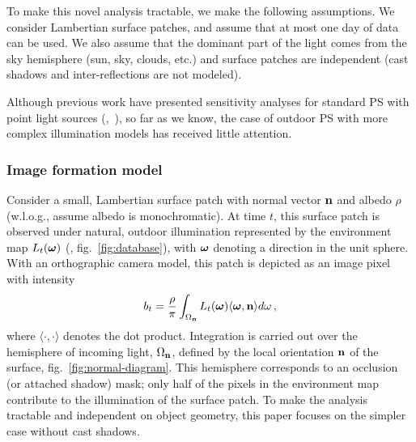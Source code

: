 To make this novel analysis tractable, we make the following assumptions. We consider Lambertian surface patches, and assume that at most one day of data can be used. We also assume that the dominant part of the light comes from the sky hemisphere (sun, sky, clouds, etc.) and surface patches are independent (cast shadows and inter-reflections are not modeled).

Although previous work have presented sensitivity analyses for standard PS with point light sources (\eg,~\cite{sun-ivc-07,jiang-bunke-sp-91,klaudiny-prl-14,shen-pg-14}), so far as we know, the case of outdoor PS with more complex illumination models has received little attention.

\subsubsection{Image formation model}

Consider a small, Lambertian surface patch with normal vector ${\bf n}$ and albedo $\rho$ (w.l.o.g., assume albedo is monochromatic). At time $t$, this surface patch is observed under natural, outdoor illumination represented by the environment map $L_t(\boldsymbol \omega)$ (\eg, fig.~\ref{fig:database}), with $\boldsymbol \omega$ denoting a direction in the unit sphere. With an orthographic camera model, this patch is depicted as an image pixel with intensity
%
\begin{equation}
    b_t = \frac{\rho}{\pi} \int_{\Omega_{\bf n}} L_t(\mathbf{\boldsymbol \omega}) \langle \boldsymbol \omega, {\bf n} \rangle d\omega \,,
    \label{eqn:imageformation-continuous}
\end{equation}
%
where $\langle \cdot, \cdot \rangle$ denotes the dot product. Integration is carried out over the hemisphere of incoming light, $\Omega_{\bf n}$, defined by the local orientation ${\bf n}$ of the surface, fig.~\ref{fig:normal-diagram}. This hemisphere corresponds to an occlusion (or attached shadow) mask; only half of the pixels in the environment map contribute to the illumination of the surface patch. To make the analysis tractable and independent on object geometry, this paper focuses on the simpler case without cast shadows.

